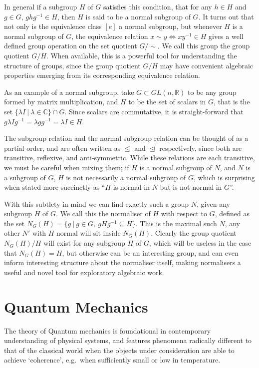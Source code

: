 In general if a subgroup $H$ of $G$ satisfies this condition, that for any $h \in H$ and $g \in G$, $ghg^{-1} \in H$, then $H$ is said to be a normal subgroup of $G$. It turns out that not only is the equivalence class $[e]$ a normal subgroup, but whenever $H$ is a normal subgroup of $G$, the equivalence relation $x \sim y \iff xy^{-1} \in H$ gives a well defined group operation on the set quotient $G/\sim$. We call this group the group quotient $G/H$. When available, this is a powerful tool for understanding the structure of groups, since the group quotient $G/H$ may have convenient algebraic properties emerging from its corresponding equivalence relation.

As an example of a normal subgroup, take $G \subset GL(n, \mathbb{R})$ to be any group formed by matrix multiplication, and $H$ to be the set of scalars in $G$, that is the set $\{\lambda I\ |\ \lambda \in \mathbb{C}\} \cap G$. Since scalars are commutative, it is straight-forward that $g\lambda I g^{-1} = \lambda gg^{-1} = \lambda I \in H$.

The subgroup relation and the normal subgroup relation can be thought of as a partial order, and are often written as $\leq$ and $\trianglelefteq$ respectively, since both are transitive, reflexive, and anti-symmetric. While these relations are each transitive, we must be careful when mixing them; if $H$ is a normal subgroup of $N$, and $N$ is a subgroup of $G$, $H$ is not necessarily a normal subgroup of $G$, which is surprising when stated more succinctly as ``$H$ is normal in $N$ but is not normal in $G$''.

With this subtlety in mind we can find exactly such a group $N$, given any subgroup $H$ of $G$. We call this the normaliser of $H$ with respect to $G$, defined as the set $N_G(H) = \{g\ |\ g \in G,\ gHg^{-1} \subseteq H\}$. This is the maximal such $N$, any other $N'$ with $H$ normal will sit inside $N_G(H)$. Clearly the group quotient $N_G(H)/H$ will exist for any subgroup $H$ of $G$, which will be useless in the case that $N_G(H) = H$, but otherwise can be an interesting group, and can even inform interesting structure about the normaliser itself, making normalisers a useful and novel tool for exploratory algebraic work.

\section{Quantum Mechanics}

The theory of Quantum mechanics is foundational in contemporary understanding of physical systems, and features phenomena radically different to that of the classical world when the objects under consideration are able to achieve `coherence', e.g.\ when sufficiently small or low in temperature.

